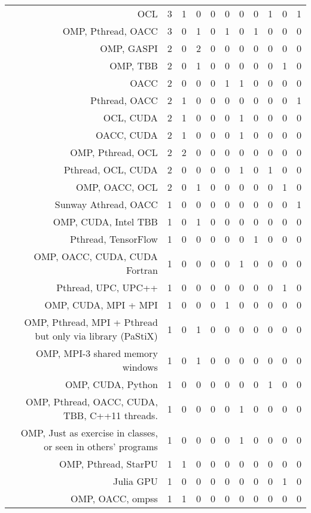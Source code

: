 {\begin{landscape}
\begin{longtable}[htb]{r|c|c|c|c|c|c|c|c|c|c}
{OCL} & 3 & 1 & 0 & 0 & 0 & 0 & 0 & 1 & 0 & 1 \\%
{OMP, Pthread, OACC} & 3 & 0 & 1 & 0 & 1 & 0 & 1 & 0 & 0 & 0 \\%
{OMP, GASPI} & 2 & 0 & 2 & 0 & 0 & 0 & 0 & 0 & 0 & 0 \\%
{OMP, TBB} & 2 & 0 & 1 & 0 & 0 & 0 & 0 & 0 & 1 & 0 \\%
{OACC} & 2 & 0 & 0 & 0 & 1 & 1 & 0 & 0 & 0 & 0 \\%
{Pthread, OACC} & 2 & 1 & 0 & 0 & 0 & 0 & 0 & 0 & 0 & 1 \\%
{OCL, CUDA} & 2 & 1 & 0 & 0 & 0 & 1 & 0 & 0 & 0 & 0 \\%
{OACC, CUDA} & 2 & 1 & 0 & 0 & 0 & 1 & 0 & 0 & 0 & 0 \\%
{OMP, Pthread, OCL} & 2 & 2 & 0 & 0 & 0 & 0 & 0 & 0 & 0 & 0 \\%
{Pthread, OCL, CUDA} & 2 & 0 & 0 & 0 & 0 & 1 & 0 & 1 & 0 & 0 \\%
{OMP, OACC, OCL} & 2 & 0 & 1 & 0 & 0 & 0 & 0 & 0 & 1 & 0 \\%
{Sunway Athread, OACC} & 1 & 0 & 0 & 0 & 0 & 0 & 0 & 0 & 0 & 1 \\%
{OMP, CUDA, Intel TBB} & 1 & 0 & 1 & 0 & 0 & 0 & 0 & 0 & 0 & 0 \\%
{Pthread, TensorFlow} & 1 & 0 & 0 & 0 & 0 & 0 & 1 & 0 & 0 & 0 \\%
{OMP, OACC, CUDA, CUDA Fortran} & 1 & 0 & 0 & 0 & 0 & 1 & 0 & 0 & 0 & 0 \\%
{Pthread, UPC, UPC++} & 1 & 0 & 0 & 0 & 0 & 0 & 0 & 0 & 1 & 0 \\%
{OMP, CUDA, MPI + MPI} & 1 & 0 & 0 & 0 & 1 & 0 & 0 & 0 & 0 & 0 \\%
{OMP, Pthread, MPI + Pthread but only via library (PaStiX)} & 1 & 0 & 1 & 0 & 0 & 0 & 0 & 0 & 0 & 0 \\%
{OMP, MPI-3 shared memory windows} & 1 & 0 & 1 & 0 & 0 & 0 & 0 & 0 & 0 & 0 \\%
{OMP, CUDA, Python} & 1 & 0 & 0 & 0 & 0 & 0 & 0 & 1 & 0 & 0 \\%
{OMP, Pthread, OACC, CUDA, TBB, C++11 threads.} & 1 & 0 & 0 & 0 & 0 & 1 & 0 & 0 & 0 & 0 \\%
{OMP, Just as exercise in classes, or seen in others' programs} & 1 & 0 & 0 & 0 & 0 & 1 & 0 & 0 & 0 & 0 \\%
{OMP, Pthread, StarPU} & 1 & 1 & 0 & 0 & 0 & 0 & 0 & 0 & 0 & 0 \\%
{Julia GPU} & 1 & 0 & 0 & 0 & 0 & 0 & 0 & 0 & 1 & 0 \\%
{OMP, OACC, ompss} & 1 & 1 & 0 & 0 & 0 & 0 & 0 & 0 & 0 & 0 \\%

\end{longtable}
\end{landscape}}
